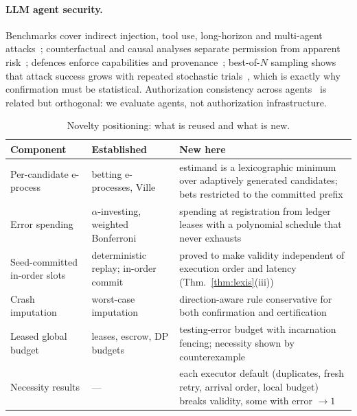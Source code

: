 \documentclass[11pt]{article}
\theoremstyle{definition}
\theoremstyle{remark}
\begin{document}
\paragraph{LLM agent security.} Benchmarks cover indirect injection, tool use, long-horizon and multi-agent attacks~\cite{debenedetti2024agentdojo,zhan2024injecagent,jiang2026agentlab,tamas2025,darkside2025,mazeika2024harmbench}; counterfactual and causal analyses separate permission from apparent risk~\cite{yang2026agentboundary,mothukuri2026causaltrace}; defences enforce capabilities and provenance~\cite{debenedetti2025camel,south2025delegation}; best-of-$N$ sampling shows that attack success grows with repeated stochastic trials~\cite{hughes2025bon}, which is exactly why confirmation must be statistical. Authorization consistency across agents~\cite{pang2019zanzibar,birgisson2014macaroons,lilienthal2025toctou} is related but orthogonal: we evaluate agents, not authorization infrastructure.

\begin{table}[t]\centering\small
\caption{Novelty positioning: what is reused and what is new.}\label{tab:novelty}
\begin{tabularx}{\linewidth}{>{\raggedright}p{3.0cm}>{\raggedright}X>{\raggedright\arraybackslash}X}
\toprule
Component & Established & New here \\\midrule
Per-candidate e-process & betting e-processes, Ville~\cite{waudbysmith2024,ramdas2023savi} & estimand is a lexicographic minimum over adaptively generated candidates; bets restricted to the committed prefix \\
Error spending & $\alpha$-investing, weighted Bonferroni~\cite{foster2008,genovese2006} & spending at registration from ledger leases with a polynomial schedule that never exhausts \\
Seed-committed in-order slots & deterministic replay; in-order commit & proved to make validity independent of execution order and latency (Thm.~\ref{thm:lexis}(iii)) \\
Crash imputation & worst-case imputation & direction-aware rule conservative for both confirmation and certification \\
Leased global budget & leases, escrow, DP budgets~\cite{gray1989leases,oneil1986escrow,luo2021privatekube} & testing-error budget with incarnation fencing; necessity shown by counterexample \\
Necessity results & --- & each executor default (duplicates, fresh retry, arrival order, local budget) breaks validity, some with error $\to1$ \\
\bottomrule\end{tabularx}
\end{table}
\end{document}
